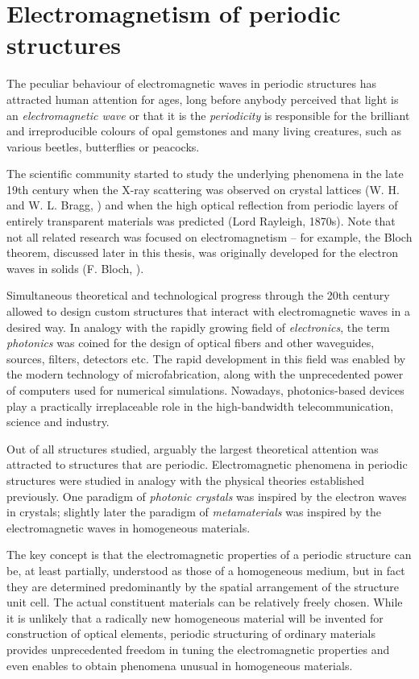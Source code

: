 \section{Electromagnetism of periodic structures} %
The peculiar behaviour of electromagnetic waves in periodic structures has attracted human attention for ages, long before anybody perceived that light is an \textit{electromagnetic wave} or that it is the \textit{periodicity} is responsible for the brilliant and irreproducible colours of opal gemstones and many living creatures, such as various beetles, butterflies or peacocks. 

The scientific community started to study the underlying phenomena in the late 19th century when the X-ray scattering was observed on crystal lattices (W. H. and W. L. Bragg, ) and when the high optical reflection from periodic layers of entirely transparent materials was predicted (Lord Rayleigh, 1870s). Note that not all related research was focused on electromagnetism -- for example, the Bloch theorem, discussed later in this thesis, was originally developed for the electron waves in solids (F. Bloch, ).

Simultaneous theoretical and technological progress through the 20th century allowed to design custom structures that interact with electromagnetic waves in a desired way. In analogy with the rapidly growing field of \textit{electronics}, the term \textit{photonics} was coined  for the design of optical fibers and other waveguides, sources, filters, detectors etc. The rapid development in this field was enabled by the modern technology of microfabrication, along with the unprecedented power of computers used for numerical simulations. Nowadays, photonics-based devices play a practically irreplaceable role in the high-bandwidth telecommunication, science and industry.

Out of all structures studied, arguably the largest theoretical attention was attracted to structures that are periodic.
Electromagnetic phenomena in periodic structures were studied in analogy with the physical theories established previously. One paradigm of \textit{photonic crystals} was inspired by the electron waves in crystals; slightly later the paradigm of \textit{metamaterials} was inspired by the electromagnetic waves in homogeneous materials. 

The key concept is that the electromagnetic properties of a periodic structure can be, at least partially, understood as those of a homogeneous medium, but in fact they are determined predominantly by the spatial arrangement of the structure unit cell. The actual constituent materials can be relatively freely chosen. %
While it is unlikely that a radically new homogeneous material will be invented for construction of optical elements, periodic structuring of ordinary materials provides unprecedented freedom in tuning the electromagnetic properties and even enables to obtain phenomena unusual in homogeneous materials. 

